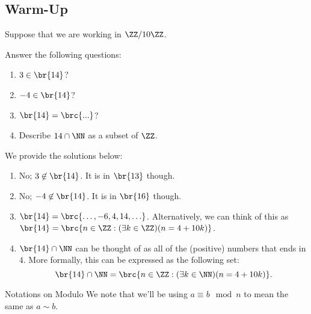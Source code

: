 \documentclass[openany]{book}
\begin{document}
\subsection{Warm-Up}
\begin{hw}
	Suppose that we are working in $\ZZ / 10 \ZZ$.
	
	Answer the following questions:
	\begin{enumerate}
		\item $3 \in \br{14}$?
		\item $-4 \in \br{14}$?
		\item $\br{14} = \brc{...}$?
		\item Describe $14 \cap \NN$ as a subset of $\ZZ$.
	\end{enumerate}
\end{hw}
\begin{solution}
	We provide the solutions below:
	
	\begin{enumerate}
		\item No; $3 \not\in \br{14}$. It is in $\br{13}$ though.
		\item No; $-4 \not\in \br{14}$. It is in $\br{16}$ though.
		\item $\br{14} = \brc{\ldots, -6, 4, 14, \ldots}$. Alternatively, we can think of this as $\br{14} = \brc{n \in \ZZ : (\exists k \in \ZZ)(n = 4 + 10k)}$.
		\item $\br{14} \cap \NN$ can be thought of as all of the (positive) numbers that ends in $4$. More formally, this can be expressed as the following set:
		\begin{equation*}
			\br{14} \cap \NN = \brc{n \in \ZZ : (\exists k \in \NN)(n = 4 + 10k)}.
		\end{equation*}
	\end{enumerate}
\end{solution}

\begin{miscbox}{Notations on Modulo}
	We note that we'll be using $a \equiv b \mod n$ to mean the same as $a \sim b$.
\end{miscbox}
\end{document}
